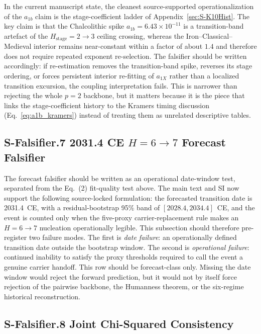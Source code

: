 \documentclass[11pt]{article}
\begin{document}
In the current manuscript state, the cleanest source-supported
operationalization of the $a_{1b}$ claim is the stage-coefficient ladder of
Appendix~\ref{sec:S-K10Hist}. The key claim is that the Chalcolithic spike
$a_{1b}=6.43\times 10^{-11}$ is a transition-band artefact of the
$H_{\mathrm{stage}}=2\to 3$ ceiling crossing, whereas the
Iron--Classical--Medieval interior remains near-constant within a factor of
about $1.4$ and therefore does not require repeated exponent re-selection.
The falsifier should be written accordingly: if re-estimation removes the
transition-band spike, reverses its stage ordering, or forces persistent
interior re-fitting of $a_{1X}$ rather than a localized transition
excursion, the coupling interpretation fails. This is narrower than rejecting
the whole $p=2$ backbone, but it matters because it is the piece that links
the stage-coefficient history to the Kramers timing discussion
(Eq.~\eqref{eq:a1b_kramers}) instead of treating them as unrelated
descriptive tables.

\subsection*{S-Falsifier.7 2031.4 CE \texorpdfstring{$H=6\to 7$}{H=6 to 7}
  Forecast Falsifier}
\label{sec:S-Falsifier-forecast}

The forecast falsifier should be written as an operational date-window test,
separated from the Eq.~(2) fit-quality test above. The main text and SI now
support the following source-locked formulation: the forecasted transition
date is 2031.4~CE, with a residual-bootstrap 95\% band of
$[2028.4,2034.4]$~CE, and the event is counted only when the five-proxy
carrier-replacement rule makes an $H{=}6\to 7$ nucleation operationally
legible. This subsection should therefore pre-register two failure modes.
The first is \emph{date failure}: an operationally defined transition date
outside the bootstrap window. The second is \emph{operational failure}:
continued inability to satisfy the proxy thresholds required to call the
event a genuine carrier handoff. This row should be forecast-class only.
Missing the date window would reject the forward prediction, but it would
not by itself force rejection of the pairwise backbone, the Humanness
theorem, or the six-regime historical reconstruction.

\subsection*{S-Falsifier.8 Joint Chi-Squared Consistency}
\label{sec:S-Falsifier-joint}
\end{document}
